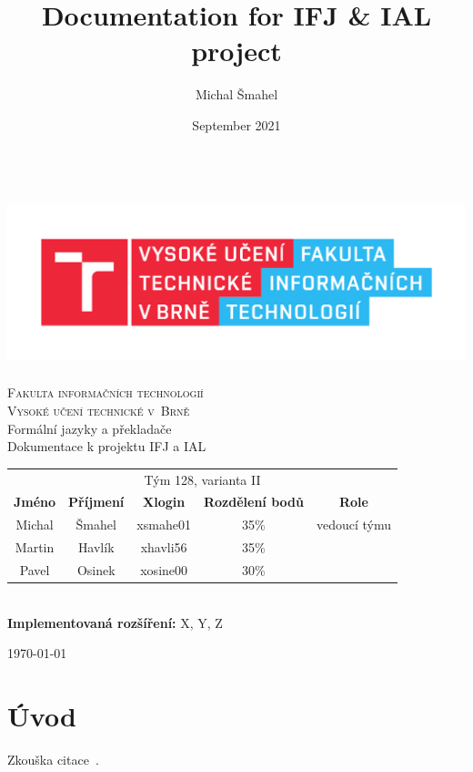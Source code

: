\documentclass[11pt,a4paper]{article}
\title{Documentation for IFJ \& IAL project}
\author{Michal Šmahel}
\date{September 2021}
\begin{document}
\begin{titlepage}
    \begin{center}
        \includegraphics[height = 160pt]{images/FIT_logo.pdf}\\
		
		{\Huge \textsc{Fakulta informačních technologií}\\[5pt]}
		{\Huge \textsc{Vysoké učení technické v~Brně}}\\
		{\LARGE Formální jazyky a překladače\\[5pt]}
		{\LARGE Dokumentace k projektu IFJ a IAL\\[30pt]}
		
		\begin{tabular}{c c c c c}
		    \multicolumn{5}{c}{Tým 128, varianta II}\\[5pt]
            \textbf{Jméno} & \textbf{Příjmení} & \textbf{Xlogin} & \textbf{Rozdělení bodů} & \textbf{Role}\\
            \hline
            Michal & Šmahel & xsmahe01 & 35\% & vedoucí týmu \\[5pt]
            Martin & Havlík & xhavli56 & 35\% &\\[5pt]
            Pavel  & Osinek & xosine00 & 30\% & 
        \end{tabular}\\[30pt]
        \textbf{Implementovaná rozšíření:} X, Y, Z
    \end{center}
    {
		\hfill
		\today
	}
\end{titlepage}

\newpage
\tableofcontents
\newpage

\section{Úvod}
    Zkouška citace~\cite{MedunaAlexander2008Eocd}.
    
\end{document}
